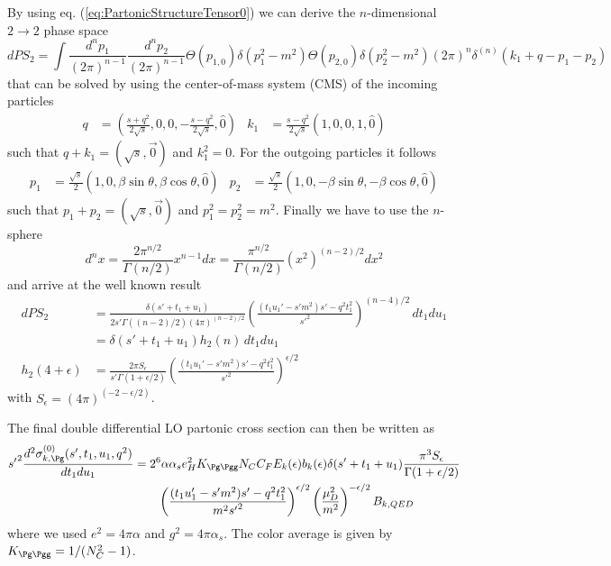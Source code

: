 By using eq. (\ref{eq:PartonicStructureTensor0}) we can derive the $n$-dimensional $2\rightarrow 2$ phase space
\begin{equation}
dPS_2 = \!\int\!\!\frac{d^{n}p_1}{(2\pi)^{n-1}}\frac{d^{n}p_2}{(2\pi)^{n-1}}\Theta(p_{1,0})\delta(p_1^2-m^2)\Theta(p_{2,0})\delta(p_2^2-m^2)(2\pi)^n\delta^{(n)}(k_1+q-p_1-p_2)
\end{equation}
that can be solved by using the center-of-mass system (CMS) of the incoming particles\cite{Bojak:2000eu}
\begin{align}
q &= \left(\frac {s+q^2}{2\sqrt s},0,0,-\frac{s-q^2}{2\sqrt s},\hat 0\right) &
k_1 &= \frac {s-q^2}{2\sqrt s}\left(1,0,0,1,\hat 0\right)
\end{align}
such that $q+k_1=(\sqrt s,\vec 0)$ and $k_1^2 = 0$. For the outgoing particles it follows
\begin{align}
p_1 &= \frac{\sqrt s} 2 \left(1,0,\beta\sin\theta,\beta\cos\theta,\hat 0\right)&
p_2 &= \frac{\sqrt s} 2 \left(1,0,-\beta\sin\theta,-\beta\cos\theta,\hat 0\right)
\end{align}
such that $p_1+p_2 = (\sqrt s,\vec 0)$ and $p_1^2 = p_2^2=m^2$. Finally we have to use the $n$-sphere
\begin{equation}
d^nx = \frac{2\pi^{n/2}}{\Gamma(n/2)}x^{n-1} dx= \frac{\pi^{n/2}}{\Gamma(n/2)}(x^2)^{(n-2)/2} dx^2
\end{equation}
and arrive at the well known result\cite{Laenen1993162}
\begin{align}
dPS_2 &= \frac {\delta(s'+t_1+u_1)} {2s'\Gamma((n-2)/2)(4\pi)^{(n-2)/2}}\left(\frac{(t_1u_1'-s'm^2)s' - q^2t_1^2}{s'^2}\right)^{(n-4)/2}\,dt_1du_1\\
 &= \delta(s'+t_1+u_1) h_2(n)\,dt_1 du_1\\
h_2(4+\epsilon) &= \frac {2\pi S_\epsilon} {s'\Gamma(1+\epsilon/2)}\left(\frac{(t_1u_1'-s'm^2)s' - q^2t_1^2}{s'^2}\right)^{\epsilon/2}
\end{align}
with $S_\epsilon = (4\pi)^{(-2-\epsilon/2)}$.

The final double differential LO partonic cross section can then be written as
\begin{align}
{s'}^2\frac{d^2\sigma_{k,\Pg}^{(0)}(s',t_1,u_1,q^2)}{dt_1du_1} &= 2^6\alpha\alpha_s e_H^2 K_{\Pg\Pgg}N_CC_F E_k(\epsilon) b_k(\epsilon)\delta(s'+t_1+u_1) \frac{\pi^3S_\epsilon}{\Gamma(1+\epsilon/2)}  \nonumber\\
 &\hspace{20pt} \left(\frac{(t_1u_1'-s'm^2)s' - q^2t_1^2}{m^2{s'}^2}\right)^{\epsilon/2}\left(\frac{\mu_D^2}{m^2}\right)^{-\epsilon/2} B_{k,QED}
\end{align}
where we used $e^2=4\pi\alpha$ and $g^2=4\pi\alpha_s$. The color average is given by $K_{\Pg\Pgg} = 1/(N_C^2-1)$.


